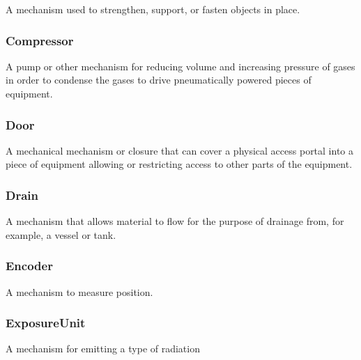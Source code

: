 A mechanism used to strengthen, support, or fasten objects in place.

\FloatBarrier

\subsubsection{Compressor}
  \label{sec:Compressor}



A pump or other mechanism for reducing volume and increasing pressure of gases in order to condense the gases to drive pneumatically powered pieces of equipment.

\FloatBarrier

\subsubsection{Door}
  \label{sec:Door}



A mechanical mechanism or closure that can cover a physical access portal into a piece of equipment allowing or restricting access to other parts of the equipment.

\FloatBarrier

\subsubsection{Drain}
  \label{sec:Drain}



A mechanism that allows material to flow for the purpose of drainage from, for example, a vessel or tank.

\FloatBarrier

\subsubsection{Encoder}
  \label{sec:Encoder}



A mechanism to measure position.

\FloatBarrier

\subsubsection{ExposureUnit}
  \label{sec:ExposureUnit}



A mechanism for emitting a type of radiation

\FloatBarrier


